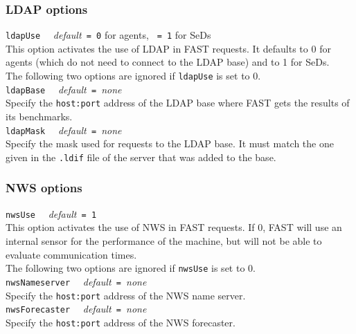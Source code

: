 \subsubsection{LDAP options}

\noindent
\texttt{ldapUse} \ \ \emph{default}\texttt{ = 0} for agents, \texttt{ = 1} for
SeDs\\
This option activates the use of LDAP in FAST requests. It defaults to 0 for
agents (which do not need to connect to the LDAP base) and to 1 for SeDs.
\\

The following two options are ignored if \texttt{ldapUse} is set to 0.
\\

\noindent
\texttt{ldapBase} \ \ \emph{default}\texttt{ = }\emph{none}\\
Specify the \texttt{host:port} address of the LDAP base where FAST gets the
results of its benchmarks.
\\

\noindent
\texttt{ldapMask} \ \ \emph{default}\texttt{ = }\emph{none}\\
Specify the mask used for requests to the LDAP base. It must match the one given
in the \texttt{.ldif} file of the server that was added to the base.


\subsubsection{NWS options}

\noindent
\texttt{nwsUse} \ \ \emph{default}\texttt{ = 1}\\
This option activates the use of NWS in FAST requests. If 0, FAST will use an
internal sensor for the performance of the machine, but will not be able to
evaluate communication times.
\\

The following two options are ignored if \texttt{nwsUse} is set to 0.
\\

\noindent
\texttt{nwsNameserver} \ \ \emph{default}\texttt{ = }\emph{none}\\
Specify the \texttt{host:port} address of the NWS name server.
\\

\noindent
\texttt{nwsForecaster} \ \ \emph{default}\texttt{ = }\emph{none}\\
Specify the \texttt{host:port} address of the NWS forecaster.
\\


